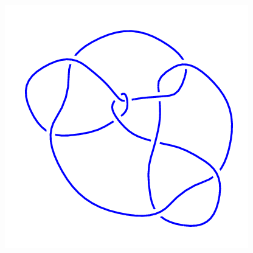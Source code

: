 \begin{figure}[H]
\begin{minipage}[b]{.18\linewidth}
	\end{minipage}
	\begin{minipage}[b]{.18\linewidth}
		\centering
		\includegraphics[width=\linewidth]{../data/10_151.png}
	\end{minipage}
\end{figure}
